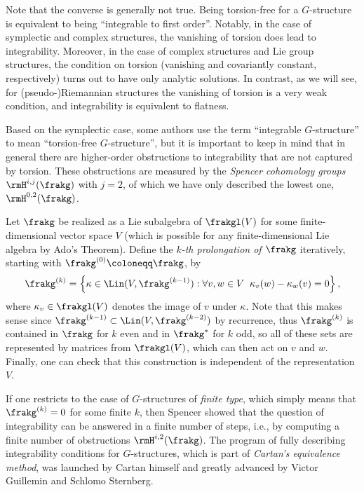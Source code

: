 \begin{rem}
    Note that the converse is generally not true. Being torsion-free for a $G$-structure is equivalent to being ``integrable to first order''. Notably, in the case of symplectic and complex structures, the vanishing of torsion does lead to integrability. Moreover, in the case of complex structures and Lie group structures, the condition on torsion (vanishing and covariantly constant, respectively) turns out to have only analytic solutions. In contrast, as we will see, for (pseudo-)Riemannian structures the vanishing of torsion is a very weak condition, and integrability is equivalent to flatness. 
    
    Based on the symplectic case, some authors use the term ``integrable $G$-structure'' to mean ``torsion-free $G$-structure'', but it is important to keep in mind that in general there are higher-order obstructions to integrability that are not captured by torsion. These obstructions are measured by the \emph{Spencer cohomology groups} $\rmH^{i,j}(\frakg)$ with $j=2$, of which we have only described the lowest one, $\rmH^{0,2}(\frakg)$. 

    Let $\frakg$ be realized as a Lie subalgebra of $\frakgl(V)$ for some finite-dimensional vector space $V$ (which is possible for any finite-dimensional Lie algebra by Ado's Theorem). Define the \emph{$k$-th prolongation of $\frakg$} iteratively, starting with $\frakg^{(0)}\coloneqq \frakg$, by
    \[\frakg^{(k)}=\left\{\kappa \in\Lin(V,\frakg^{(k-1)}):\forall v,w\in V\;\; \kappa_v(w)-\kappa_w(v)=0\right\},\]
    where $\kappa_v\in\frakgl(V)$ denotes the image of $v$ under $\kappa$. Note that this makes sense since $\frakg^{(k-1)}\subset \Lin(V,\frakg^{(k-2)})$ by recurrence, thus $\frakg^{(k)}$ is contained in $\frakg$ for $k$ even and in $\frakg^\ast$ for $k$ odd, so all of these sets are represented by matrices from $\frakgl(V)$, which can then act on $v$ and $w$. Finally, one can check that this construction is independent of the representation $V$.
    
    If one restricts to the case of $G$-structures of \emph{finite type}, which simply means that $\frakg^{(k)}=0$ for some finite $k$, then Spencer showed that the question of integrability can be answered in a finite number of steps, i.e., by computing a finite number of obstructions $\rmH^{i,2}(\frakg)$. The program of fully describing integrability conditions for $G$-structures, which is part of \emph{Cartan's equivalence method}, was launched by Cartan himself and greatly advanced by Victor Guillemin and Schlomo Sternberg.
\end{rem}

